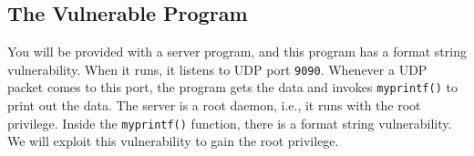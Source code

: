 \subsection{The Vulnerable Program}

You will be provided with a server program, and 
this program has a format string vulnerability. 
When it runs, it listens to UDP port
\texttt{9090}. Whenever a UDP packet comes to this port, the program
gets the data and invokes \texttt{myprintf()} to print out the data. 
The server is a root daemon, i.e., it runs with the root privilege. 
Inside the \texttt{myprintf()} function, there is a format string
vulnerability. We will exploit this vulnerability to gain the root
privilege.  

